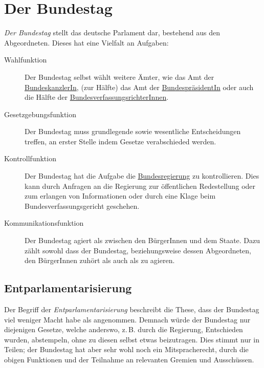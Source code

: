 \documentclass{article}
\begin{document}
\section{Der Bundestag}
\emph{Der Bundestag} stellt das deutsche Parlament dar, bestehend aus den Abgeordneten. Dieses hat eine Vielfalt an Aufgaben:
\begin{description}
 \item[Wahlfunktion] Der Bundestag selbst wählt weitere Ämter, wie das Amt der \hyperref[Die BundeskanzlerIn]{BundeskanzlerIn}, (zur Hälfte) das Amt der \hyperref[Die BundespräsidentIn]{BundespräsidentIn} oder auch die Hälfte der \hyperref[Das Bundesverfassungsgericht]{BundesverfassungsrichterInnen}.
 \item[Gesetzgebungsfunktion] Der Bundestag muss grundlegende sowie wesentliche Entscheidungen treffen, an erster Stelle indem Gesetze verabschieded werden.
 \item[Kontrollfunktion] Der Bundestag hat die Aufgabe die \hyperref[Die Bundesregierung]{Bundesregierung} zu kontrollieren. Dies kann durch Anfragen an die Regierung zur öffentlichen Redestellung oder zum erlangen von Informationen oder durch eine Klage beim Bundesverfassungsgericht geschehen.
 \item[Kommunikationsfunktion] Der Bundestag agiert als  zwischen den BürgerInnen und dem Staate. Dazu zählt sowohl dass der Bundestag, beziehungsweise dessen Abgeordneten, den BürgerInnen zuhört als auch als  zu agieren.
\end{description} 
 
\subsection{Entparlamentarisierung} 
Der Begriff der \emph{Entparlamentarisierung} beschreibt die These, dass der Bundestag viel weniger Macht habe als angenommen. Demnach würde der Bundestag nur diejenigen Gesetze, welche anderswo, z.\,B. durch die Regierung, Entschieden wurden, abstempeln, ohne zu diesen selbst etwas beizutragen. Dies stimmt nur in Teilen; der Bundestag hat aber sehr wohl noch ein Mitspracherecht, durch die obigen Funktionen und der Teilnahme an relevanten Gremien und Ausschüssen.
\end{document}
